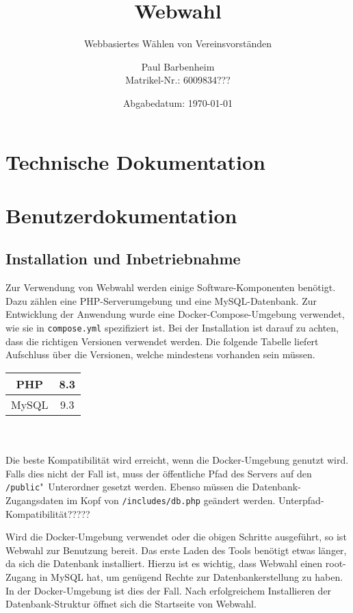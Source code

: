 \documentclass[a4paper]{scrartcl}
\newcommand{\file}[1]{\texttt{#1}}
\begin{document}
	\titlehead{Modul: Web Engineering II}
	\subject{Projektdokumentation}
	\author{Paul Barbenheim \\ Matrikel-Nr.: 6009834???}
	\title{Webwahl}
	\subtitle{Webbasiertes Wählen von Vereinsvorständen}
	\date{Abgabedatum: \today}
	
	
	\maketitle
	
	\section{Technische Dokumentation}
	
	\section{Benutzerdokumentation}
	
	\subsection{Installation und Inbetriebnahme}
	Zur Verwendung von Webwahl werden einige Software-Komponenten benötigt. Dazu zählen eine PHP-Serverumgebung und eine MySQL-Datenbank. Zur Entwicklung der Anwendung wurde eine Docker-Compose-Umgebung verwendet, wie sie in \file{compose.yml} spezifiziert ist. Bei der Installation ist darauf zu achten, dass die richtigen Versionen verwendet werden. Die folgende Tabelle liefert Aufschluss über die Versionen, welche mindestens vorhanden sein müssen.\\
	
	\begin{tabular}{|c|c|}
		\hline
		PHP & 8.3 \\
		\hline
		MySQL & 9.3 \\
		\hline
	\end{tabular}\\\\
	
	Die beste Kompatibilität wird erreicht, wenn die Docker-Umgebung genutzt wird. Falls dies nicht der Fall ist, muss der öffentliche Pfad des Servers auf den \file{/public}"~Unterordner gesetzt werden. Ebenso müssen die Datenbank-Zugangsdaten im Kopf von \file{/includes/db.php} geändert werden.
	Unterpfad-Kompatibilität?????
	
	Wird die Docker-Umgebung verwendet oder die obigen Schritte ausgeführt, so ist Webwahl zur Benutzung bereit. Das erste Laden des Tools benötigt etwas länger, da sich die Datenbank installiert. Hierzu ist es wichtig, dass Webwahl einen root-Zugang in MySQL hat, um genügend Rechte zur Datenbankerstellung zu haben. In der Docker-Umgebung ist dies der Fall. Nach erfolgreichem Installieren der Datenbank-Struktur öffnet sich die Startseite von Webwahl.
	
\end{document}
